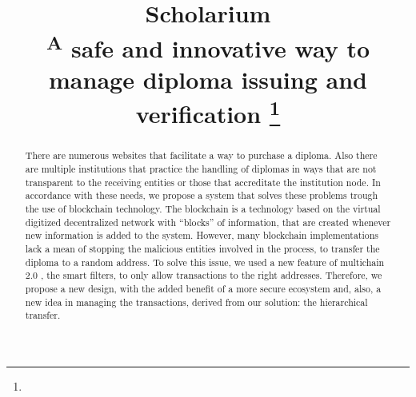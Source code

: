 \documentclass[conference]{IEEEtran}
\begin{document}
\title{Scholarium \\
{\footnotesize \textsuperscript * A safe and innovative way to manage diploma issuing and verification}
\thanks{}
}

\author{
\and
{}
\and
{}
\and
{}
\and
{}

}

\maketitle

\begin{abstract}
There are numerous websites that facilitate a way to purchase a diploma. Also there are multiple institutions that practice the handling of diplomas in ways that are not transparent to the receiving entities or those that accreditate the institution node. In accordance with these needs, we propose a system that solves these problems trough the use of blockchain technology. The blockchain is a technology based on the virtual digitized decentralized network with “blocks” of information, that are created whenever new information is added to the system. However, many blockchain implementations lack a mean of stopping the malicious entities involved in the process, to transfer the diploma to a random address. To solve this issue, we used a new feature of multichain 2.0 , the smart filters, to only allow transactions to the right addresses. Therefore, we propose a new design, with the added benefit of a more secure ecosystem and, also, a new idea in managing the transactions, derived from our solution: the hierarchical transfer. 
\end{abstract}
\end{document}
